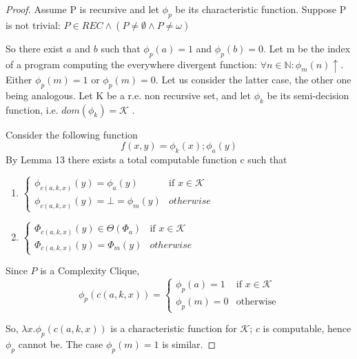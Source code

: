 \documentclass[10pt, a4paper, oneside, titlepage, draft]{article}
\begin{document}
\begin{proof}
    Assume P is recursive and let $\phi_p$ be its characteristic function. 
    Suppose P is not trivial: $P \in REC \wedge (P \neq \emptyset \wedge P \neq \omega)$

    So there exist $a$ and $b$ such that $\phi_p(a) = 1$ and $\phi_p(b) = 0$.
    Let m be the index of a program computing the everywhere divergent function: $\forall n \in \mathbb{N} : \phi_m(n) \uparrow$.
    Either $\phi_p(m) = 1$ or $\phi_p(m) = 0$. Let us consider the latter case, the other one being analogous.
    Let K be a r.e. non recursive set, and let $\phi_k$ be its semi-decision function, i.e. $dom(\phi_k) = \mathcal{K}$ . 
    
    Consider the following function 
    \begin{equation*}
        f(x,y) = \phi_k(x); \phi_a(y)
    \end{equation*}
    By Lemma 13 there exists a total computable function c such that
    \begin{enumerate}[label=(\alph*)]
        \item $
            \begin{cases}
                \phi_{c(a,k,x)}(y) = \phi_a(y)                  & \text{if  } x \in \mathcal{K} \\
                \phi_{c(a,k,x)}(y) = \bot = \phi_m(y)           & otherwise
            \end{cases}
        $

        \item $
            \begin{cases}
                \Phi_{c(a,k,x)}(y) \in \Theta (\Phi_a)    & \text{if  } x \in \mathcal{K} \\
                \Phi_{c(a,k,x)}(y) = \Phi_m(y)              & otherwise
            \end{cases}
        $
    \end{enumerate}
Since $P$ is a Complexity Clique,
    \begin{equation*}
        \phi_p(c(a,k,x)) = 
        \begin{cases}
            \phi_p(a) = 1   & \text{if  } x \in \mathcal{K}           \\
            \phi_p(m) = 0   & \text{otherwise}
        \end{cases}
    \end{equation*}

    So, $\lambda x . \phi_p(c(a,k,x))$ is a characteristic function for $\mathcal{K}$; $c$ is computable, hence $\phi_p$ cannot be. The case $\phi_p(m) = 1$ is similar.

\end{proof}
\end{document}
